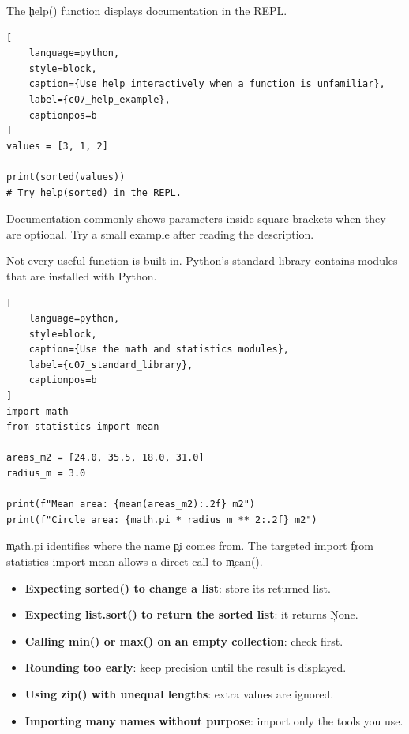 
The \c{help()} function displays documentation in the REPL.

\begin{lstlisting}[
    language=python,
    style=block,
    caption={Use help interactively when a function is unfamiliar},
    label={c07_help_example},
    captionpos=b
]
values = [3, 1, 2]

print(sorted(values))
# Try help(sorted) in the REPL.
\end{lstlisting}

Documentation commonly shows parameters inside square brackets when they are
optional. Try a small example after reading the description.


Not every useful function is built in. Python's standard library contains
modules that are installed with Python.

\begin{lstlisting}[
    language=python,
    style=block,
    caption={Use the math and statistics modules},
    label={c07_standard_library},
    captionpos=b
]
import math
from statistics import mean

areas_m2 = [24.0, 35.5, 18.0, 31.0]
radius_m = 3.0

print(f"Mean area: {mean(areas_m2):.2f} m2")
print(f"Circle area: {math.pi * radius_m ** 2:.2f} m2")
\end{lstlisting}

\c{math.pi} identifies where the name \c{pi} comes from. The targeted import
\c{from statistics import mean} allows a direct call to \c{mean()}.


\begin{itemize}
    \item \textbf{Expecting sorted() to change a list}: store its returned list.
    \item \textbf{Expecting list.sort() to return the sorted list}: it returns \c{None}.
    \item \textbf{Calling min() or max() on an empty collection}: check first.
    \item \textbf{Rounding too early}: keep precision until the result is displayed.
    \item \textbf{Using zip() with unequal lengths}: extra values are ignored.
    \item \textbf{Importing many names without purpose}: import only the tools you use.
\end{itemize}

